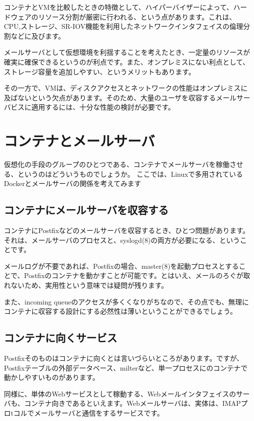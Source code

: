 コンテナとVMを比較したときの特徴として、ハイパーバイザーによって、ハードウェアのリソース分割が厳密に行われる、という点があります。これは、CPU,ストレージ、SR-IOV機能を利用したネットワークインタフェイスの倫理分割などに及びます。

メールサーバとして仮想環境を利揺することを考えたとき、一定量のリソースが確実に確保できるというのが利点です。また、オンプレミスにない利点として、ストレージ容量を追加しやすい、というメリットもあります。

その一方で、VMは、ディスクアクセスとネットワークの性能はオンプレミスに及ばないという欠点があります。そのため、大量のユーザを収容するメールサーバビスに適用するには、十分な性能の検討が必要です。

\section{コンテナとメールサーバ}

仮想化の手段のグループのひとつである、コンテナでメールサーバを稼働させる、というのはどういうものでしょうか。
ここでは、Linuxで多用されているDockerとメールサーバの関係を考えてみます

\subsection{コンテナにメールサーバを収容する}

コンテナにPostfixなどのメールサーバを収容するとき、ひとつ問題があります。それは、メールサーバのプロセスと、syslogd(8)の両方が必要になる、ということです。

メールログが不要であれば、Postfixの場合、master(8)を起動プロセスとすることで、Postfixのコンテナを動かすことが可能です。とはいえ、メールのろぐが取れないため、実用性という意味では疑問が残ります。

また、incoming queueのアクセスが多くくなりがちなので、その点でも、無理にコンテナに収容する設計にする必然性は薄いということができるでしょう。

\subsection{コンテナに向くサービス}

Postfixそのものはコンテナに向くとは言いづらいところがあります。ですが、Postfixテーブルの外部データベース、milterなど、単一プロセスにのコンテナで動かしやすいものがあります。

同様に、単体のWebサービスとして稼動する、Webメールインタフェイスのサーバも、コンテナ向きであるといえます。Webメールサーバは、実体は、IMAPプロtコルでメールサーバと通信をするサービスです。

